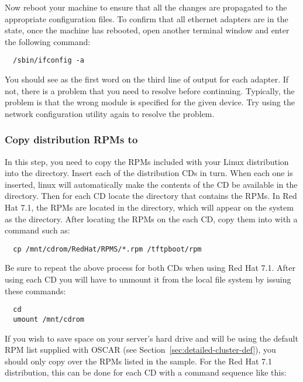 Now reboot your machine to ensure that all the changes are propagated
to the appropriate configuration files. To confirm that all ethernet
adapters are in the  state, once the machine has rebooted,
open another terminal window and enter the following command:

\begin{verbatim}
  /sbin/ifconfig -a
\end{verbatim}
  
You should see  as the first word on the third line of output
for each adapter. If not, there is a problem that you need to resolve
before continuing. Typically, the problem is that the wrong module is
specified for the given device. Try using the network configuration
utility again to resolve the problem.
  
\subsubsection{Copy distribution RPMs to }

In this step, you need to copy the RPMs included with your Linux
distribution into the  directory. 
\begchange
Insert each of the distribution CDs in turn.
When each one is inserted, linux will automatically make the
contents of the CD be available in the  directory.
Then for each CD locate the directory that contains the RPMs.
In Red Hat 7.1, the RPMs are located in the 
directory, which will appear on the system as the 
 directory. 
\endchange
 After locating the RPMs on the each CD, copy them into
 with a command such as:

\begin{verbatim}
  cp /mnt/cdrom/RedHat/RPMS/*.rpm /tftpboot/rpm
\end{verbatim}
  
Be sure to repeat the above process for both CDs when using Red Hat
7.1.
\begchange
After using each CD you will have to unmount it from the local
file system by issuing these commands:

\begin{verbatim}
  cd
  umount /mnt/cdrom
\end{verbatim}
\endchange
If you wish to save space on your server's hard drive and will be
using the default RPM list supplied with OSCAR (see
Section~\ref{sec:detailed-cluster-def}),
you should only copy over the RPMs listed in the sample.
\begchange
For the Red Hat 7.1 distribution, this can be done for each CD with
a command sequence like this:

